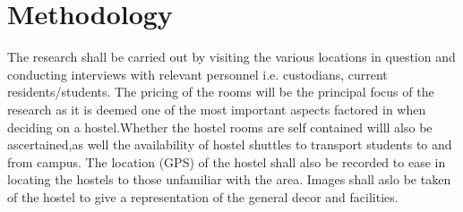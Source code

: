 \documentclass{article}
\begin{document}
\section{Methodology}
The research shall be carried out by visiting the various locations in question and conducting interviews with relevant personnel i.e. custodians, current residents/students. The pricing of the rooms will be the principal focus of the research as it is deemed one of the most important aspects factored in when deciding on a hostel.Whether the hostel rooms are self contained willl also be ascertained,as well the availability of hostel shuttles to transport students to and from campus. The location (GPS) of the hostel shall also be recorded to ease in locating the hostels to those unfamiliar with the area. Images shall aslo be taken of the hostel to give a representation of the general decor and facilities.
\end{document}
